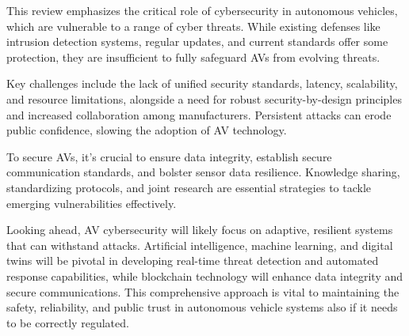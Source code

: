 This review emphasizes the critical role of cybersecurity in autonomous vehicles,
which are vulnerable to a range of cyber threats.
While existing defenses like intrusion detection systems, regular updates, and current standards offer some protection,
they are insufficient to fully safeguard AVs from evolving threats.

Key challenges include the lack of unified security standards, latency, scalability, and resource limitations, alongside a need for robust security-by-design principles and increased collaboration among manufacturers.
Persistent attacks can erode public confidence, slowing the adoption of AV technology.

To secure AVs, it's crucial to ensure data integrity, establish secure communication standards, and bolster sensor data resilience.
Knowledge sharing, standardizing protocols, and joint research are essential strategies to tackle emerging vulnerabilities effectively.

Looking ahead, AV cybersecurity will likely focus on adaptive, resilient systems that can withstand attacks.
Artificial intelligence, machine learning, and digital twins will be pivotal in developing real-time threat detection and automated response capabilities,
while blockchain technology will enhance data integrity and secure communications.
This comprehensive approach is vital to maintaining the safety, reliability, and public trust in autonomous vehicle systems also if it needs to be correctly regulated.